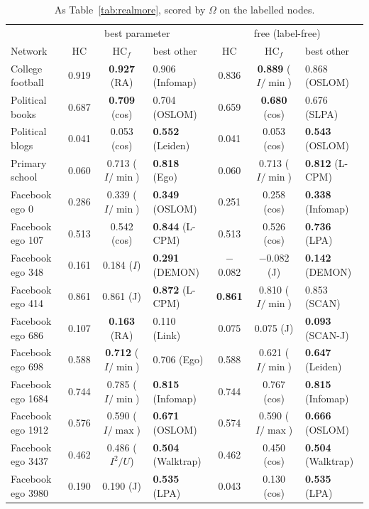 \begin{table}[t]
\caption{As Table~\ref{tab:realmore}, scored by $\Omega$ on the labelled nodes.}
\label{tab:realmoreomega}
\footnotesize
\begin{ruledtabular}
\begin{tabular}{l|ccl|ccl}
 & \multicolumn{3}{c|}{best parameter} & \multicolumn{3}{c}{free (label-free)} \\
Network & HC & HC$_f$ & best other & HC & HC$_f$ & best other \\
\hline
College football & 0.919 & \textbf{0.927} (RA) & 0.906 (Infomap) & 0.836 & \textbf{0.889} ($I/\min$) & 0.868 (OSLOM) \\
Political books & 0.687 & \textbf{0.709} (cos) & 0.704 (OSLOM) & 0.659 & \textbf{0.680} (cos) & 0.676 (SLPA) \\
Political blogs & 0.041 & 0.053 (cos) & \textbf{0.552} (Leiden) & 0.041 & 0.053 (cos) & \textbf{0.543} (OSLOM) \\
Primary school & 0.060 & 0.713 ($I/\min$) & \textbf{0.818} (Ego) & 0.060 & 0.713 ($I/\min$) & \textbf{0.812} (L-CPM) \\
Facebook ego 0 & 0.286 & 0.339 ($I/\min$) & \textbf{0.349} (OSLOM) & 0.251 & 0.258 (cos) & \textbf{0.338} (Infomap) \\
Facebook ego 107 & 0.513 & 0.542 (cos) & \textbf{0.844} (L-CPM) & 0.513 & 0.526 (cos) & \textbf{0.736} (LPA) \\
Facebook ego 348 & 0.161 & 0.184 ($I$) & \textbf{0.291} (DEMON) & $-$0.082 & $-$0.082 (J) & \textbf{0.142} (DEMON) \\
Facebook ego 414 & 0.861 & 0.861 (J) & \textbf{0.872} (L-CPM) & \textbf{0.861} & 0.810 ($I/\min$) & 0.853 (SCAN) \\
Facebook ego 686 & 0.107 & \textbf{0.163} (RA) & 0.110 (Link) & 0.075 & 0.075 (J) & \textbf{0.093} (SCAN-J) \\
Facebook ego 698 & 0.588 & \textbf{0.712} ($I/\min$) & 0.706 (Ego) & 0.588 & 0.621 ($I/\min$) & \textbf{0.647} (Leiden) \\
Facebook ego 1684 & 0.744 & 0.785 ($I/\min$) & \textbf{0.815} (Infomap) & 0.744 & 0.767 (cos) & \textbf{0.815} (Infomap) \\
Facebook ego 1912 & 0.576 & 0.590 ($I/\max$) & \textbf{0.671} (OSLOM) & 0.574 & 0.590 ($I/\max$) & \textbf{0.666} (OSLOM) \\
Facebook ego 3437 & 0.462 & 0.486 ($I^2/U$) & \textbf{0.504} (Walktrap) & 0.462 & 0.450 (cos) & \textbf{0.504} (Walktrap) \\
Facebook ego 3980 & 0.190 & 0.190 (J) & \textbf{0.535} (LPA) & 0.043 & 0.130 (cos) & \textbf{0.535} (LPA) \\
\end{tabular}
\end{ruledtabular}
\end{table}
